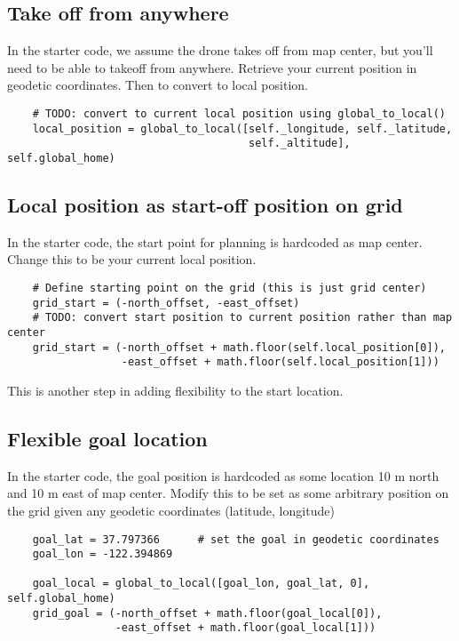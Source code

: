 \documentclass[12pt]{article}
\begin{document}
\subsection{Take off from anywhere}
In the starter code, we assume the drone takes off from map center, but you'll need to be able to takeoff from anywhere. Retrieve your current position in geodetic coordinates. Then to convert to local position.

\begin{verbatim}
    # TODO: convert to current local position using global_to_local()
    local_position = global_to_local([self._longitude, self._latitude,
                                      self._altitude], self.global_home)
\end{verbatim}


\subsection{Local position as start-off position on grid}
In the starter code, the start point for planning is hardcoded as map center. Change this to be your current local position.

\begin{verbatim}
    # Define starting point on the grid (this is just grid center)
    grid_start = (-north_offset, -east_offset)
    # TODO: convert start position to current position rather than map center
    grid_start = (-north_offset + math.floor(self.local_position[0]),
                  -east_offset + math.floor(self.local_position[1]))
\end{verbatim}

This is another step in adding flexibility to the start location.

\subsection{Flexible goal location}

In the starter code, the goal position is hardcoded as some location 10 m north and 10 m east of map center. Modify this to be set as some arbitrary position on the grid given any geodetic coordinates (latitude, longitude)

\begin{verbatim}
    goal_lat = 37.797366      # set the goal in geodetic coordinates
    goal_lon = -122.394869

    goal_local = global_to_local([goal_lon, goal_lat, 0], self.global_home)
    grid_goal = (-north_offset + math.floor(goal_local[0]),
                 -east_offset + math.floor(goal_local[1]))
\end{verbatim}
\end{document}

